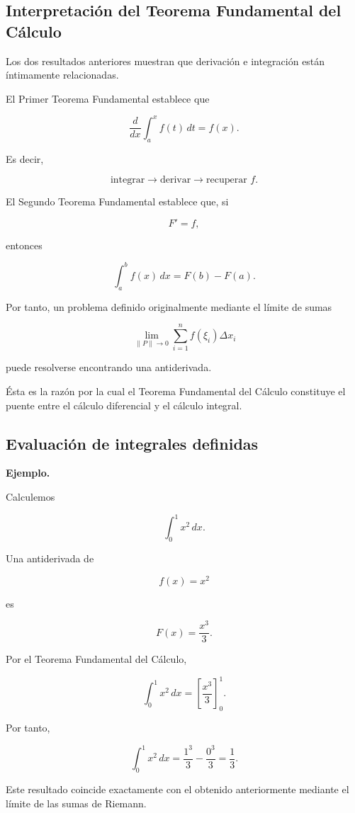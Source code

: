 \documentclass[12pt]{article}
\newenvironment{Ejem}
{\par\medskip\noindent\textbf{Ejemplo.}\ }
{\par\medskip}
\begin{document}
\subsection{Interpretación del Teorema Fundamental del Cálculo}

Los dos resultados anteriores muestran que derivación e integración están
íntimamente relacionadas.

El Primer Teorema Fundamental establece que

\[
\boxed{
\frac{d}{dx}
\int_a^x f(t)\,dt
=
f(x).
}
\]

Es decir,

\[
\text{integrar}
\longrightarrow
\text{derivar}
\longrightarrow
\text{recuperar }f.
\]

El Segundo Teorema Fundamental establece que, si

\[
F'=f,
\]

entonces

\[
\boxed{
\int_a^b f(x)\,dx
=
F(b)-F(a).
}
\]

Por tanto, un problema definido originalmente mediante el límite de sumas

\[
\lim_{\|P\|\to0}
\sum_{i=1}^{n}f(\xi_i)\Delta x_i
\]

puede resolverse encontrando una antiderivada.

Ésta es la razón por la cual el Teorema Fundamental del Cálculo constituye
el puente entre el cálculo diferencial y el cálculo integral.

\subsection{Evaluación de integrales definidas}

\begin{Ejem}

Calculemos

\[
\int_0^1 x^2\,dx.
\]

Una antiderivada de

\[
f(x)=x^2
\]

es

\[
F(x)=\frac{x^3}{3}.
\]

Por el Teorema Fundamental del Cálculo,

\[
\int_0^1x^2\,dx
=
\left[
\frac{x^3}{3}
\right]_0^1.
\]

Por tanto,

\[
\int_0^1x^2\,dx
=
\frac{1^3}{3}
-
\frac{0^3}{3}
=
\boxed{\frac13}.
\]

Este resultado coincide exactamente con el obtenido anteriormente mediante
el límite de las sumas de Riemann.

\end{Ejem}
\end{document}
